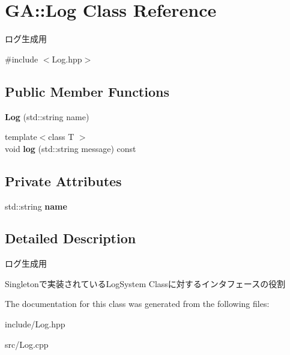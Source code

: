 \hypertarget{class_g_a_1_1_log}{}\section{GA\+::Log Class Reference}
\label{class_g_a_1_1_log}


ログ生成用  




{\ttfamily \#include $<$Log.\+hpp$>$}

\subsection*{Public Member Functions}
\begin{DoxyCompactItemize}
\item 
\mbox{\label{class_g_a_1_1_log_a5d3ba60faab73f5bab67b26662c3d7a2}} 
{\bfseries Log} (std\+::string name)
\item 
\mbox{\label{class_g_a_1_1_log_a735f78d742b1e09fccc0ac2d3798d5f5}} 
{\footnotesize template$<$class T $>$ }\\void {\bfseries log} (std\+::string message) const
\end{DoxyCompactItemize}
\subsection*{Private Attributes}
\begin{DoxyCompactItemize}
\item 
\mbox{\label{class_g_a_1_1_log_a752ef810e781908cb2dfb2b38f25354f}} 
std\+::string {\bfseries name}
\end{DoxyCompactItemize}


\subsection{Detailed Description}
ログ生成用 

Singletonで実装されている\+Log\+System Classに対するインタフェースの役割 

The documentation for this class was generated from the following files\+:\begin{DoxyCompactItemize}
\item 
include/Log.\+hpp\item 
src/Log.\+cpp\end{DoxyCompactItemize}
